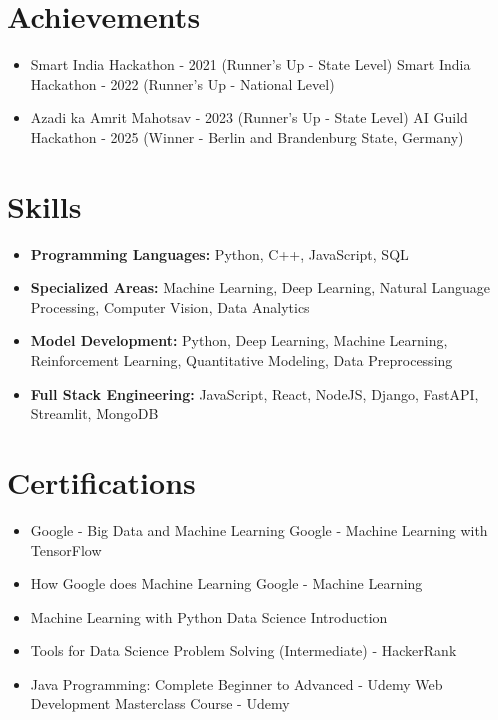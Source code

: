 \documentclass[a4paper,10pt]{article}
\begin{document}
\section*{Achievements}
\begin{itemize}
\item Smart India Hackathon - 2021 (Runner's Up - State Level) \hfill Smart India Hackathon - 2022 (Runner's Up - National Level)
\item Azadi ka Amrit Mahotsav - 2023 (Runner's Up - State Level) \hfill AI Guild Hackathon - 2025 (Winner - Berlin and Brandenburg State, Germany)
\end{itemize}

\section*{Skills}
\begin{itemize}
  \item \textbf{Programming Languages:} Python, C++, JavaScript, SQL
  \item \textbf{Specialized Areas:} Machine Learning, Deep Learning, Natural Language Processing, Computer Vision, Data Analytics
  \item \textbf{Model Development:} Python, Deep Learning, Machine Learning, Reinforcement Learning, Quantitative Modeling, Data Preprocessing
  \item \textbf{Full Stack Engineering:} JavaScript, React, NodeJS, Django, FastAPI, Streamlit, MongoDB
\end{itemize}

\section*{Certifications}
\begin{itemize}
\item Google - Big Data and Machine Learning \hfill Google - Machine Learning with TensorFlow
\item How Google does Machine Learning \hfill Google - Machine Learning
\item Machine Learning with Python \hfill Data Science Introduction
\item Tools for Data Science \hfill Problem Solving (Intermediate) - HackerRank
\item Java Programming: Complete Beginner to Advanced - Udemy \hfill Web Development Masterclass Course - Udemy
\end{itemize}
\end{document}
